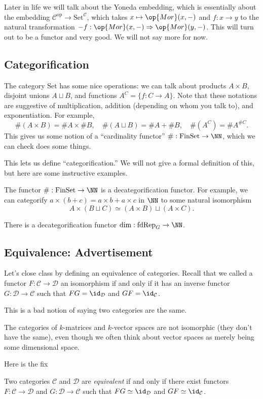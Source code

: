 \documentclass[../notes.tex]{subfiles}
\begin{document}
\begin{remark}
	Later in life we will talk about the Yoneda embedding, which is essentially about the embedding $\mathcal C^\mathrm{op}\to\mathrm{Set}^\mathcal C$, which takes $x\mapsto\op{Mor}(x,-)$ and $f:x\to y$ to the natural transformation $-f:\op{Mor}(x,-)\Rightarrow\op{Mor}(y,-)$. This will turn out to be a functor and very good. We will not say more for now.
\end{remark}

\subsection{Categorification}
The category $\mathrm{Set}$ has some nice operations: we can talk about products $A\times B$, disjoint unions $A\sqcup B$, and functions $A^C=\{f:C\to A\}$. Note that these notations are suggestive of multiplication, addition (depending on whom you talk to), and exponentiation. For example,
\[\#(A\times B)=\#A\times\#B,\quad\#(A\sqcup B)=\#A+\#B,\quad\#\left(A^C\right)=\#A^{\#C}.\]
This gives us some notion of a ``cardinality functor'' $\#:\mathrm{FinSet}\to\NN$, which we can check does some things.

This lets us define ``categorification.'' We will not give a formal definition of this, but here are some instructive examples.
\begin{example}
	The functor $\#:\mathrm{FinSet}\to\NN$ is a decategorification functor. For example, we can categorify $a\times(b+c)=a\times b+a\times c$ in $\NN$ to some natural isomorphism
	\[A\times(B\sqcup C)\simeq (A\times B)\sqcup (A\times C).\]
\end{example}
\begin{example}
	There is a decategorification functor $\dim:\mathrm{fdRep}_G\to\NN$.
\end{example}

\subsection{Equivalence: Advertisement}
Let's close class by defining an equivalence of categories. Recall that we called a functor $F:\mathcal C\to\mathcal D$ an isomorphism if and only if it has an inverse functor $G:\mathcal D\to\mathcal C$ such that $FG=\id_\mathcal D$ and $GF=\id_\mathcal C$.

This is a bad notion of saying two categories are the same.
\begin{example}
	The categories of $k$-matrices and $k$-vector spaces are not isomorphic (they don't have the same), even though we often think about vector spaces as merely being some dimensional space.
\end{example}
Here is the fix
\begin{definition}[Equivalence]
	Two categories $\mathcal C$ and $\mathcal D$ are \textit{equivalent} if and only if there exist functors $F:\mathcal C\to\mathcal D$ and $G:\mathcal D\to\mathcal C$ such that $FG\simeq\id_{\mathcal D}$ and $GF\simeq\id_\mathcal C$.
\end{definition}
\end{document}
